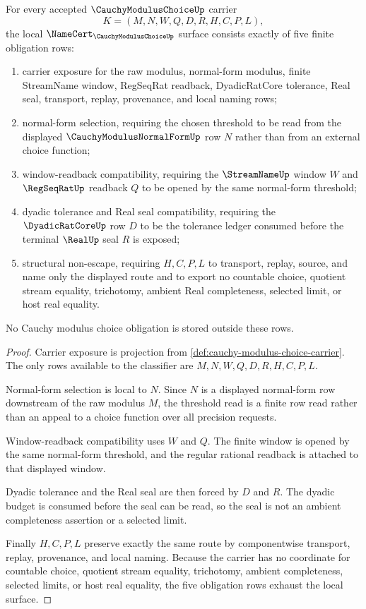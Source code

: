 \begin{theorem}
\label{thm:cauchy-modulus-choice-namecert-obligations}
For every accepted $\CauchyModulusChoiceUp$ carrier
$$
K=(M,N,W,Q,D,R,H,C,P,L),
$$
the local $\NameCert_{\CauchyModulusChoiceUp}$ surface consists exactly of five finite obligation rows:
\begin{enumerate}
\item carrier exposure for the raw modulus, normal-form modulus, finite StreamName window, RegSeqRat readback, DyadicRatCore tolerance, Real seal, transport, replay, provenance, and local naming rows;
\item normal-form selection, requiring the chosen threshold to be read from the displayed $\CauchyModulusNormalFormUp$ row $N$ rather than from an external choice function;
\item window-readback compatibility, requiring the $\StreamNameUp$ window $W$ and $\RegSeqRatUp$ readback $Q$ to be opened by the same normal-form threshold;
\item dyadic tolerance and Real seal compatibility, requiring the $\DyadicRatCoreUp$ row $D$ to be the tolerance ledger consumed before the terminal $\RealUp$ seal $R$ is exposed;
\item structural non-escape, requiring $H,C,P,L$ to transport, replay, source, and name only the displayed route and to export no countable choice, quotient stream equality, trichotomy, ambient Real completeness, selected limit, or host real equality.
\end{enumerate}
No Cauchy modulus choice obligation is stored outside these rows.
\end{theorem}
\begin{proof}
Carrier exposure is projection from \autoref{def:cauchy-modulus-choice-carrier}. The only rows available to the classifier are $M,N,W,Q,D,R,H,C,P,L$.

Normal-form selection is local to $N$. Since $N$ is a displayed normal-form row downstream of the raw modulus $M$, the threshold read is a finite row read rather than an appeal to a choice function over all precision requests.

Window-readback compatibility uses $W$ and $Q$. The finite window is opened by the same normal-form threshold, and the regular rational readback is attached to that displayed window.

Dyadic tolerance and the Real seal are then forced by $D$ and $R$. The dyadic budget is consumed before the seal can be read, so the seal is not an ambient completeness assertion or a selected limit.

Finally $H,C,P,L$ preserve exactly the same route by componentwise transport, replay, provenance, and local naming. Because the carrier has no coordinate for countable choice, quotient stream equality, trichotomy, ambient completeness, selected limits, or host real equality, the five obligation rows exhaust the local surface.
\end{proof}

